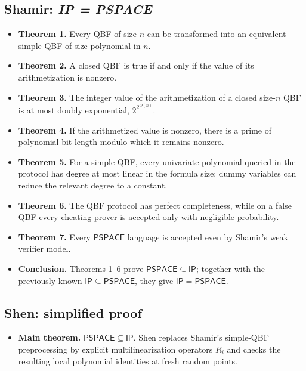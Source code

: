 \documentclass[10pt]{article}
\newcommand{\IP}{\mathsf{IP}}
\newcommand{\PSPACE}{\mathsf{PSPACE}}
\begin{document}
\subsection*{Shamir: \emph{IP = PSPACE}}
\begin{itemize}
\item \textbf{Theorem 1.} Every QBF of size $n$ can be transformed into an
equivalent simple QBF of size polynomial in $n$.
\item \textbf{Theorem 2.} A closed QBF is true if and only if the value of its
arithmetization is nonzero.
\item \textbf{Theorem 3.} The integer value of the arithmetization of a closed
size-$n$ QBF is at most doubly exponential, $2^{2^{O(n)}}$.
\item \textbf{Theorem 4.} If the arithmetized value is nonzero, there is a prime
of polynomial bit length modulo which it remains nonzero.
\item \textbf{Theorem 5.} For a simple QBF, every univariate polynomial queried
in the protocol has degree at most linear in the formula size; dummy variables
can reduce the relevant degree to a constant.
\item \textbf{Theorem 6.} The QBF protocol has perfect completeness, while on a
false QBF every cheating prover is accepted only with negligible probability.
\item \textbf{Theorem 7.} Every $\PSPACE$ language is accepted even by Shamir's
weak verifier model.
\item \textbf{Conclusion.} Theorems 1--6 prove
$\PSPACE\subseteq\IP$; together with the previously known
$\IP\subseteq\PSPACE$, they give $\IP=\PSPACE$.
\end{itemize}

\subsection*{Shen: simplified proof}
\begin{itemize}
\item \textbf{Main theorem.} $\PSPACE\subseteq\IP$.  Shen replaces Shamir's
simple-QBF preprocessing by explicit multilinearization operators $R_i$ and
checks the resulting local polynomial identities at fresh random points.
\end{itemize}
\end{document}
